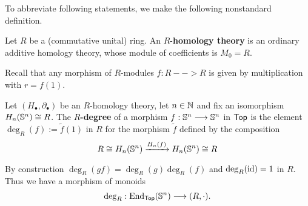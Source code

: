 	\begin{lemma}
	\end{lemma}

	To abbreviate following statements, we make the following nonstandard definition.

	\begin{definition}
		Let $R$ be a (commutative unital) ring. An $R$-\textbf{homology theory} is an ordinary additive homology theory, whose module of coefficients is $M_0 = R$.
	\end{definition}


	Recall that any morphism of $R$-modules $f:R --> R$ is given by multiplication with $r = f(1)$.

	\begin{definition}
		Let $(H_\bullet,\partial_\bullet)$ be an $R$-homology theory, let $n \in \N$ and fix an isomorphism $H_n(\S^n) \isom R$. The \textbf{$R$-degree} of a morphism $f:\S^n --> \S^n$ in $\ncat{Top}$ is the element $\deg_R(f) := \tilde{f}(1)$ in $R$ for the morphism $\tilde f$ defined by the composition
		\begin{equation*}
			R \isom H_n(\S^n) \xrightarrow{H_n(f)} {H}_n(\S^n)\isom R
		\end{equation*}

		By construction $\deg_R(gf) = \deg_R(g)\deg_R(f)$ and $\deg_R(\id) = 1$ in $R$. Thus we have a morphism of monoids
		\begin{equation*}
			\deg_R: \End_\ncat{Top}(\S^n) \longrightarrow (R,\cdot).
		\end{equation*}
	\end{definition}


